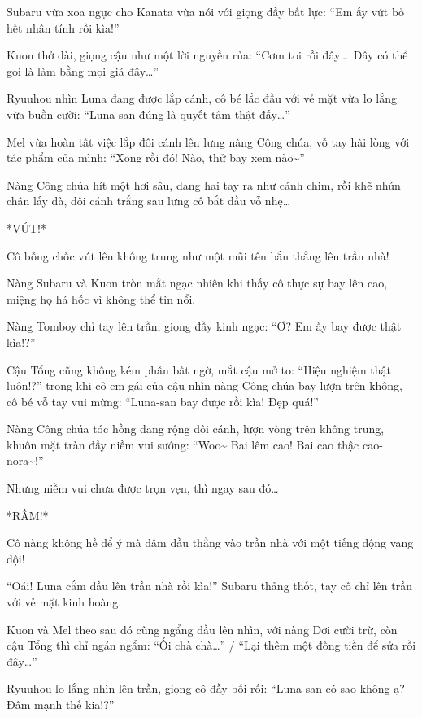 \documentclass[../main.tex]{subfiles}
\begin{document}

Subaru vừa xoa ngực cho Kanata vừa nói với giọng đầy bất lực: ``Em ấy vứt bỏ hết nhân tính rồi kìa!''

Kuon thở dài, giọng cậu như một lời nguyền rủa: ``Cơm toi rồi đây\dots\ Đây có thể gọi là làm bằng mọi giá đây\dots''

Ryuuhou nhìn Luna đang được lắp cánh, cô bé lắc đầu với vẻ mặt vừa lo lắng vừa buồn cười: ``Luna-san đúng là quyết tâm thật đấy\dots''

Mel vừa hoàn tất việc lắp đôi cánh lên lưng nàng Công chúa, vỗ tay hài lòng với tác phẩm của mình: ``Xong rồi đó! Nào, thử bay xem nào\~{}''

Nàng Công chúa hít một hơi sâu, dang hai tay ra như cánh chim, rồi khẽ nhún chân lấy đà, đôi cánh trắng sau lưng cô bắt đầu vỗ nhẹ\dots

*VÚT!*

Cô bỗng chốc vút lên không trung như một mũi tên bắn thẳng lên trần nhà!

Nàng Subaru và Kuon tròn mắt ngạc nhiên khi thấy cô thực sự bay lên cao, miệng họ há hốc vì không thể tin nổi.

Nàng Tomboy chỉ tay lên trần, giọng đầy kinh ngạc: ``Ơ? Em ấy bay được thật kìa!?''

Cậu Tổng cũng không kém phần bất ngờ, mắt cậu mở to: ``Hiệu nghiệm thật luôn!?'' trong khi cô em gái của cậu nhìn nàng Công chúa bay lượn trên không, cô bé vỗ tay vui mừng: ``Luna-san bay được rồi kìa! Đẹp quá!''

Nàng Công chúa tóc hồng dang rộng đôi cánh, lượn vòng trên không trung, khuôn mặt tràn đầy niềm vui sướng: ``Woo\~{} Bai lêm cao! Bai cao thậc cao-nora\~{}!''

Nhưng niềm vui chưa được trọn vẹn, thì ngay sau đó\dots

*RẦM!*

Cô nàng không hề để ý mà đâm đầu thẳng vào trần nhà với một tiếng động vang dội!


``Oái! Luna cắm đầu lên trần nhà rồi kìa!'' Subaru thảng thốt, tay cô chỉ lên trần với vẻ mặt kinh hoàng.

Kuon và Mel theo sau đó cũng ngẩng đầu lên nhìn, với nàng Dơi cười trừ, còn cậu Tổng thì chỉ ngán ngẩm: ``Ối chà chà\dots'' / ``Lại thêm một đống tiền để sửa rồi đây\dots''

Ryuuhou lo lắng nhìn lên trần, giọng cô đầy bối rối: ``Luna-san có sao không ạ? Đâm mạnh thế kia!?''
\end{document}
